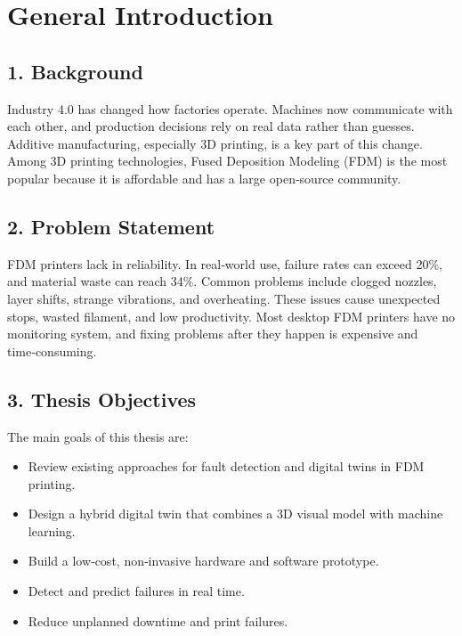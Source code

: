 \chapter*{General Introduction}
\label{chap:introduction}

\section*{1. Background}
Industry 4.0 has changed how factories operate. Machines now communicate with each other, and production decisions rely on real data rather than guesses. Additive manufacturing, especially 3D printing, is a key part of this change. Among 3D printing technologies, Fused Deposition Modeling (FDM) is the most popular because it is affordable and has a large open‑source community.

\section*{2. Problem Statement}
FDM printers lack in reliability. In real‑world use, failure rates can exceed 20\%, and material waste can reach 34\%. Common problems include clogged nozzles, layer shifts, strange vibrations, and overheating. These issues cause unexpected stops, wasted filament, and low productivity. Most desktop FDM printers have no monitoring system, and fixing problems after they happen is expensive and time‑consuming.

\section*{3. Thesis Objectives}
The main goals of this thesis are:
\begin{itemize}
    \item Review existing approaches for fault detection and digital twins in FDM printing.
    \item Design a hybrid digital twin that combines a 3D visual model with machine learning.
    \item Build a low‑cost, non‑invasive hardware and software prototype.
    \item Detect and predict failures in real time.
    \item Reduce unplanned downtime and print failures.
\end{itemize}

